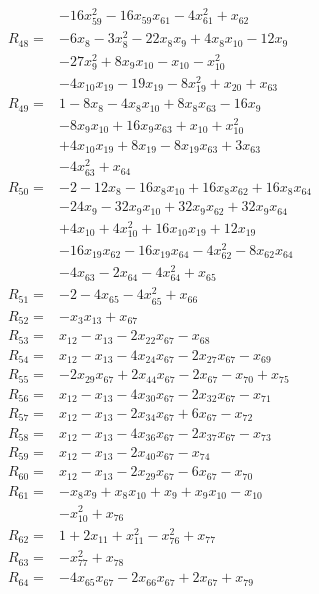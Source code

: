\begin{align*}
&-16x_{59}^{2} -16x_{59}x_{61} -4x_{61}^{2} +x_{62}\\[3pt]
R_{48}={}&-6x_{8} -3x_{8}^{2} -22x_{8}x_{9} +4x_{8}x_{10} -12x_{9}\\
&-27x_{9}^{2} +8x_{9}x_{10} -x_{10} -x_{10}^{2}\\
&-4x_{10}x_{19} -19x_{19} -8x_{19}^{2} +x_{20} +x_{63}\\[3pt]
R_{49}={}&1 -8x_{8} -4x_{8}x_{10} +8x_{8}x_{63} -16x_{9}\\
&-8x_{9}x_{10} +16x_{9}x_{63} +x_{10} +x_{10}^{2}\\
&+4x_{10}x_{19} +8x_{19} -8x_{19}x_{63} +3x_{63}\\
&-4x_{63}^{2} +x_{64}\\[3pt]
R_{50}={}&-2 -12x_{8} -16x_{8}x_{10} +16x_{8}x_{62} +16x_{8}x_{64}\\
&-24x_{9} -32x_{9}x_{10} +32x_{9}x_{62} +32x_{9}x_{64}\\
&+4x_{10} +4x_{10}^{2} +16x_{10}x_{19} +12x_{19}\\
&-16x_{19}x_{62} -16x_{19}x_{64} -4x_{62}^{2} -8x_{62}x_{64}\\
&-4x_{63} -2x_{64} -4x_{64}^{2} +x_{65}\\[3pt]
R_{51}={}&-2 -4x_{65} -4x_{65}^{2} +x_{66}\\[3pt]
R_{52}={}&-x_{3}x_{13} +x_{67}\\[3pt]
R_{53}={}&x_{12} -x_{13} -2x_{22}x_{67} -x_{68}\\[3pt]
R_{54}={}&x_{12} -x_{13} -4x_{24}x_{67} -2x_{27}x_{67} -x_{69}\\[3pt]
R_{55}={}&-2x_{29}x_{67} +2x_{44}x_{67} -2x_{67} -x_{70} +x_{75}\\[3pt]
R_{56}={}&x_{12} -x_{13} -4x_{30}x_{67} -2x_{32}x_{67} -x_{71}\\[3pt]
R_{57}={}&x_{12} -x_{13} -2x_{34}x_{67} +6x_{67} -x_{72}\\[3pt]
R_{58}={}&x_{12} -x_{13} -4x_{36}x_{67} -2x_{37}x_{67} -x_{73}\\[3pt]
R_{59}={}&x_{12} -x_{13} -2x_{40}x_{67} -x_{74}\\[3pt]
R_{60}={}&x_{12} -x_{13} -2x_{29}x_{67} -6x_{67} -x_{70}\\[3pt]
R_{61}={}&-x_{8}x_{9} +x_{8}x_{10} +x_{9} +x_{9}x_{10} -x_{10}\\
&-x_{10}^{2} +x_{76}\\[3pt]
R_{62}={}&1 +2x_{11} +x_{11}^{2} -x_{76}^{2} +x_{77}\\[3pt]
R_{63}={}&-x_{77}^{2} +x_{78}\\[3pt]
R_{64}={}&-4x_{65}x_{67} -2x_{66}x_{67} +2x_{67} +x_{79}\\[3pt]

\end{align*}
